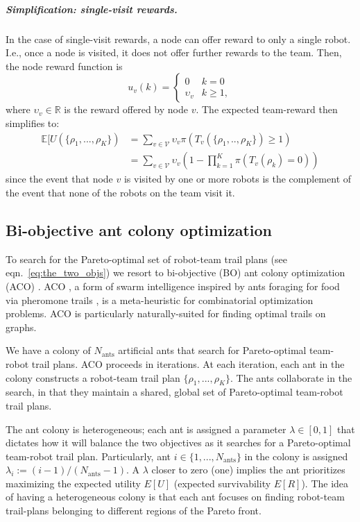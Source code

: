 \documentclass[11pt, oneside]{article}
\begin{document}
\vspace{-\baselineskip}
\subparagraph{Simplification: single-visit rewards.}
In the case of single-visit rewards, a node can offer reward to only a single robot. I.e., once a node is visited, it does not offer further rewards to the team. Then, the node reward function is
\begin{equation}
	u_v(k) = \begin{cases}
		0 & k = 0 \\
		\upsilon_v & k \geq 1,
	\end{cases}
\end{equation} where $\upsilon_v \in \mathbb{R}$ is the reward offered by node $v$. The expected team-reward then simplifies to:
\begin{align}
	\mathbb{E}[U(\{\rho_1, ..., \rho_K\}) & = \sum_{v \in \mathcal{V} } \upsilon_v \pi(T_v(\{\rho_1, .., \rho_K\}) \geq 1) \\
		      & = \sum_{v \in \mathcal{V} } \upsilon_v \left(1 - \prod_{k=1}^K  \pi(T_v(\rho_k) =0) \right) 
\end{align} since the event that node $v$ is visited by one or more robots is the complement of the event that none of the robots on the team visit it.



\subsection{Bi-objective ant colony optimization}
To search for the Pareto-optimal set of robot-team trail plans (see eqn.~\ref{eq:the_two_objs}) we resort to bi-objective (BO) ant colony optimization (ACO) \cite{iredi2001bi}. 
ACO \cite{dorigo2006ant}, a form of swarm intelligence \cite{bonabeau1999swarm} inspired by ants foraging for food via pheromone trails \cite{bonabeau2000inspiration}, is a meta-heuristic for combinatorial optimization problems. ACO is particularly naturally-suited for finding optimal trails on graphs. 

We have a colony of $N_{\text{ants}}$ artificial ants that search for Pareto-optimal team-robot trail plans. 
ACO proceeds in iterations. 
At each iteration, each ant in the colony constructs a robot-team trail plan $\{\rho_1, ..., \rho_K\}$. 
The ants collaborate in the search, in that they maintain a shared, global set of Pareto-optimal team-robot trail plans.

The ant colony is heterogeneous; each ant is assigned a parameter $\lambda \in [0, 1]$ that dictates how it will balance the two objectives as it searches for a Pareto-optimal team-robot trail plan. Particularly, ant $i\in\{1, ..., N_{\text{ants}}\}$ in the colony is assigned $\lambda_i := (i-1) / (N_{\text{ants}}-1)$. A $\lambda$ closer to zero (one) implies the ant prioritizes maximizing the expected utility $E[U]$ (expected survivability $E[R]$). The idea of having a heterogeneous colony is that each ant focuses on finding robot-team trail-plans belonging to different regions of the Pareto front. 
\end{document}
